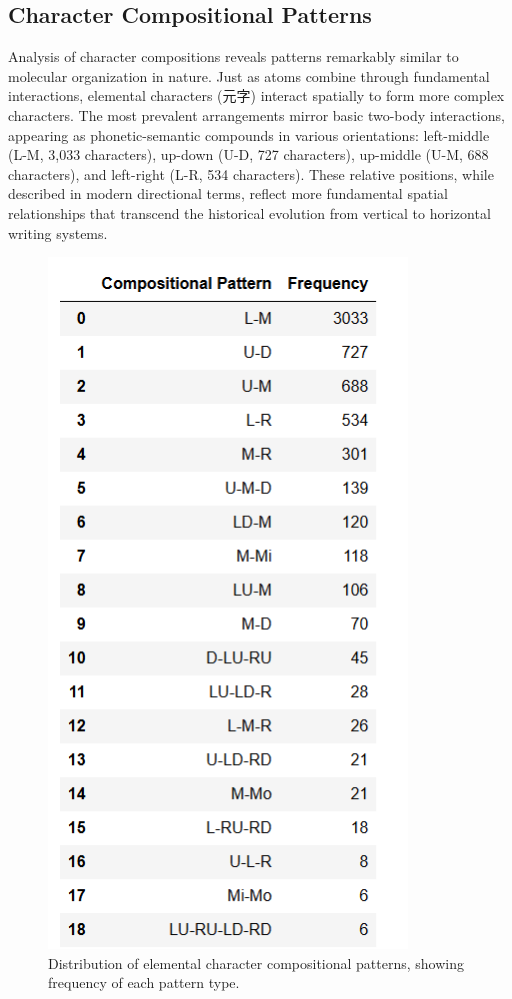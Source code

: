 \documentclass[11pt,letterpaper]{article}
\begin{document}
\subsection{Character Compositional
Patterns}\label{character-compositional-patterns}

Analysis of character compositions reveals patterns remarkably similar
to molecular organization in nature. Just as atoms combine through
fundamental interactions, elemental characters (元字) interact spatially
to form more complex characters. The most prevalent arrangements mirror
basic two-body interactions, appearing as phonetic-semantic compounds in
various orientations: left-middle (L-M, 3,033 characters), up-down (U-D,
727 characters), up-middle (U-M, 688 characters), and left-right (L-R,
534 characters). These relative positions, while described in modern
directional terms, reflect more fundamental spatial relationships that
transcend the historical evolution from vertical to horizontal writing
systems.

\begin{figure}
\centering
\includegraphics[width=0.85\textwidth]{./images/app_compositional_pattern.png}
\caption{Distribution of elemental character compositional patterns,
showing frequency of each pattern type.}
\end{figure}
\end{document}
